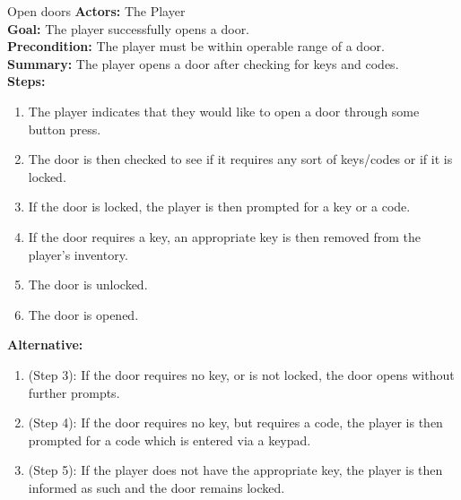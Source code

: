 \documentclass[12pt]{report}
\begin{document}
\begin{subsection}{Open doors}
\textbf{Actors:} The Player \\
\textbf{Goal:} The player successfully opens a door. \\
\textbf{Precondition:} The player must be within operable range of a door. \\
\textbf{Summary:} The player opens a door after checking for keys and codes. \\
\textbf{Steps:}
\begin{enumerate}
	\item The player indicates that they would like to open a door through some button press.
	\item The door is then checked to see if it requires any sort of keys/codes or if it is locked.
	\item If the door is locked, the player is then prompted for a key or a code.
	\item If the door requires a key, an appropriate key is then removed from the player's inventory.
	\item The door is unlocked.
	\item The door is opened.
\end{enumerate}
\textbf{Alternative:}
\begin{enumerate}
	\item (Step 3): If the door requires no key, or is not locked, the door opens without further prompts.
	\item (Step 4): If the door requires no key, but requires a code, the player is then prompted for a code which is entered via a keypad.
	\item (Step 5): If the player does not have the appropriate key, the player is then informed as such and the door remains locked.
\end{enumerate}
\end{subsection}
\end{document}
